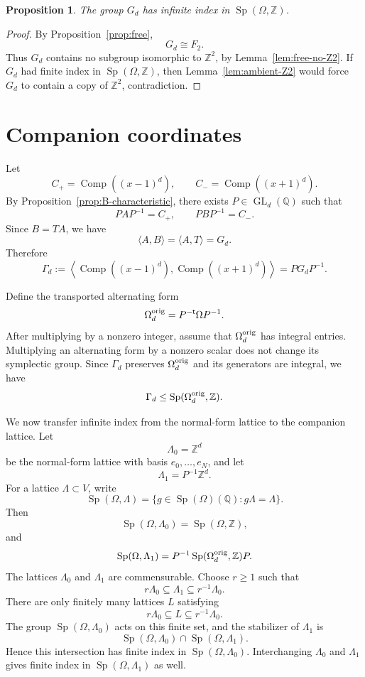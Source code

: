 \documentclass[a4paper,11pt]{amsart}
\newtheorem{proposition}[theorem]{Proposition}
\theoremstyle{remark}
\newcommand{\Z}{\mathbb Z}
\newcommand{\Q}{\mathbb Q}
\DeclareMathOperator{\Comp}{Comp}
\DeclareMathOperator{\GL}{GL}
\DeclareMathOperator{\Sp}{Sp}
\numberwithin{equation}{section}
\begin{document}
\begin{proposition}\label{prop:normal-infinite-index}
The group \(G_d\) has infinite index in \(\Sp(\Omega,\Z)\).
\end{proposition}

\begin{proof}
By Proposition~\ref{prop:free},
\[
        G_d\cong F_2.
\]
Thus \(G_d\) contains no subgroup isomorphic to \(\Z^2\), by Lemma~\ref{lem:free-no-Z2}.  If \(G_d\) had finite index in \(\Sp(\Omega,\Z)\), then Lemma~\ref{lem:ambient-Z2} would force \(G_d\) to contain a copy of \(\Z^2\), contradiction.
\end{proof}

\section{Companion coordinates}

Let
\[
        C_+=\Comp((x-1)^d),
        \qquad
        C_-=\Comp((x+1)^d).
\]
By Proposition~\ref{prop:B-characteristic}, there exists \(P\in\GL_d(\Q)\) such that
\[
        PAP^{-1}=C_+,
        \qquad
        PBP^{-1}=C_-.
\]
Since \(B=TA\), we have
\[
        \langle A,B\rangle=\langle A,T\rangle=G_d.
\]
Therefore
\[
        \Gamma_d:=
        \left\langle
        \Comp((x-1)^d),\Comp((x+1)^d)
        \right\rangle
        =
        PG_dP^{-1}.
\]

Define the transported alternating form
\[
        \Omega_d^{\rm orig}=P^{-\mathsf t}\Omega P^{-1}.
\]
After multiplying by a nonzero integer, assume that \(\Omega_d^{\rm orig}\) has integral entries.  Multiplying an alternating form by a nonzero scalar does not change its symplectic group.  Since \(\Gamma_d\) preserves \(\Omega_d^{\rm orig}\) and its generators are integral, we have
\[
        \Gamma_d\le\Sp(\Omega_d^{\rm orig},\Z).
\]

We now transfer infinite index from the normal-form lattice to the companion lattice.  Let
\[
        \Lambda_0=\Z^d
\]
be the normal-form lattice with basis \(e_0,\ldots,e_N\), and let
\[
        \Lambda_1=P^{-1}\Z^d.
\]
For a lattice \(\Lambda\subset V\), write
\[
        \Sp(\Omega,\Lambda)
        =
        \{g\in\Sp(\Omega)(\Q):g\Lambda=\Lambda\}.
\]
Then
\[
        \Sp(\Omega,\Lambda_0)=\Sp(\Omega,\Z),
\]
and
\[
        \Sp(\Omega,\Lambda_1)
        =
        P^{-1}\Sp(\Omega_d^{\rm orig},\Z)P.
\]
The lattices \(\Lambda_0\) and \(\Lambda_1\) are commensurable.  Choose \(r\ge1\) such that
\[
        r\Lambda_0\subseteq\Lambda_1\subseteq r^{-1}\Lambda_0.
\]
There are only finitely many lattices \(L\) satisfying
\[
        r\Lambda_0\subseteq L\subseteq r^{-1}\Lambda_0.
\]
The group \(\Sp(\Omega,\Lambda_0)\) acts on this finite set, and the stabilizer of \(\Lambda_1\) is
\[
        \Sp(\Omega,\Lambda_0)\cap\Sp(\Omega,\Lambda_1).
\]
Hence this intersection has finite index in \(\Sp(\Omega,\Lambda_0)\).  Interchanging \(\Lambda_0\) and \(\Lambda_1\) gives finite index in \(\Sp(\Omega,\Lambda_1)\) as well.
\end{document}
